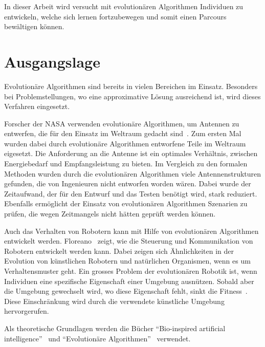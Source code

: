   In dieser Arbeit wird versucht mit evolutionären Algorithmen Individuen zu entwickeln,
  welche sich lernen fortzubewegen und somit einen Parcours bewältigen können.

  \section{Ausgangslage}

    Evolutionäre Algorithmen sind bereits in vielen Bereichen im Einsatz.
    Besonders bei Problemstellungen, wo eine approximative Lösung ausreichend ist,
    wird dieses Verfahren eingesetzt.

    \medskip

    Forscher der NASA verwenden evolutionäre Algorithmen, um Antennen zu entwerfen,
    die für den Einsatz im Weltraum gedacht sind~\cite{Hornby2006}.
    Zum ersten Mal wurden dabei durch evolutionäre Algorithmen entworfene Teile im Weltraum eigesetzt.
    Die Anforderung an die Antenne ist ein optimales Verhältnis, zwischen Energiebedarf und Empfangsleistung zu bieten.
    Im Vergleich zu den formalen Methoden wurden durch die evolutionären Algorithmen viele Antennenstrukturen gefunden,
    die von Ingenieuren nicht entworfen worden wären.
    Dabei wurde der Zeitaufwand, der für den Entwurf und das Testen benötigt wird, stark reduziert.
    Ebenfalls ermöglicht der Einsatz von evolutionären Algorithmen Szenarien zu prüfen,
    die wegen Zeitmangels nicht hätten geprüft werden können.

    \medskip

    Auch das Verhalten von Robotern kann mit Hilfe von evolutionären Algorithmen entwickelt werden.
    Floreano~\cite{Floreano2010} zeigt, wie die Steuerung und Kommunikation von Robotern entwickelt werden kann.
    Dabei zeigen sich Ähnlichkeiten in der Evolution von künstlichen Robotern und natürlichen Organismen,
    wenn es um Verhaltensmuster geht.
    Ein grosses Problem der evolutionären Robotik ist,
    wenn Individuen eine spezifische Eigenschaft einer Umgebung ausnützen.
    Sobald aber die Umgebung gewechselt wird, wo diese Eigenschaft fehlt, sinkt die Fitness~\cite[S.6]{Floreano2010}.
    Diese Einschränkung wird durch die verwendete künstliche Umgebung hervorgerufen.

    \medskip

    Als theoretische Grundlagen werden die Bücher ``Bio-inspired artificial intelligence''~\cite{book:bioInspired} und
    ``Evolutionäre Algorithmen''~\cite{book:evAlgo} verwendet.

